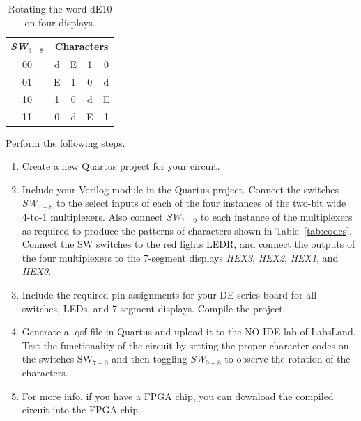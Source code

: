 \documentclass[epsfig,10pt,fullpage]{article}
\begin{document}
\begin{table}[H]
\begin{minipage}[t]{12.5 cm}
\begin{center}
\begin{tabular}{c|cccc}
{\it SW}$_{9-8}$ & \multicolumn{4}{c}{Characters} \\
\hline
{\rule[0mm]{0mm}{5mm}00} & d & E & 1 & 0\\ 
01 & E & 1 & 0 & d\\
10 & 1 & 0 & d & E\\
11 & 0 & d & E & 1\\
\end{tabular}
\end{center}
\end{minipage}
\caption{Rotating the word dE10 on four displays.}
\label{tab:rotate}
\end{table}

Perform the following steps.
\begin{enumerate}
\item Create a new Quartus project for your circuit.
\item Include your Verilog module in the Quartus project. Connect the switches 
{\it SW}$_{9-8}$ to the select inputs of each of the four instances of the two-bit 
wide 4-to-1 multiplexers. Also connect {\it SW}$_{7-0}$ to each instance of the
multiplexers as required to produce the patterns of characters shown in Table~\ref{tab:codes}.
Connect the SW switches to the red lights LEDR, and connect the outputs of the four 
multiplexers to the 7-segment displays {\it HEX3}, {\it HEX2}, {\it HEX1}, and {\it HEX0}.
\item Include the required pin assignments for your DE-series board for all switches, LEDs, 
and 7-segment displays. Compile the project.
\item Generate a .qsf file in Quartus and upload it to the NO-IDE lab of LabsLand. Test the functionality of the 
circuit by setting the proper character codes on the switches SW$_{7-0}$ and then 
toggling {\it SW}$_{9-8}$ to observe the rotation of the characters.
\item For more info, if you have a FPGA chip, you can download the compiled circuit into the FPGA chip.
\end{enumerate}
\end{document}
